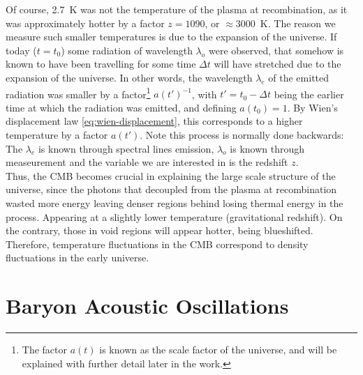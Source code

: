 Of course, \SI{2.7}{K} was not the temperature of the plasma at recombination, as it was approximately hotter by a factor $z=1090$, or $\approx$\SI{3000}{K}. The reason we measure such smaller temperatures is due to the expansion of the universe.
If today ($t=t_0$) some radiation of wavelength $\lambda_o$ were observed, that somehow is known to have been travelling for some time $\Delta t$ will have stretched due to the expansion of the universe. In other words, the wavelength $\lambda_e$ of the emitted radiation was smaller by a factor\footnote{The factor $a(t)$ is known as the scale factor of the universe, and will be explained with further detail later in the work.} $a(t')^{-1}$, with $t' = t_0-\Delta t$ being the earlier time at which the radiation was emitted, and defining $a(t_0)=1$. By Wien's displacement law \eqref{eq:wien-displacement}, this corresponds to a higher temperature by a factor $a(t')$. Note this process is normally done backwards: The $\lambda_e$ is known through spectral lines emission, $\lambda_o$ is known through measeurement and the variable we are interested in is the redshift $z.$\\


Thus, the CMB becomes crucial in explaining the large scale structure of the universe, since the photons that decoupled from the plasma at recombination wasted more energy leaving denser regions behind losing thermal energy in the process. Appearing at a slightly lower temperature (gravitational redshift). On the contrary, those in void regions will appear hotter, being blueshifted. Therefore, temperature fluctuations in the CMB correspond to density fluctuations in the early universe. \\

\section{Baryon Acoustic Oscillations}
\label{sec:BAO}


